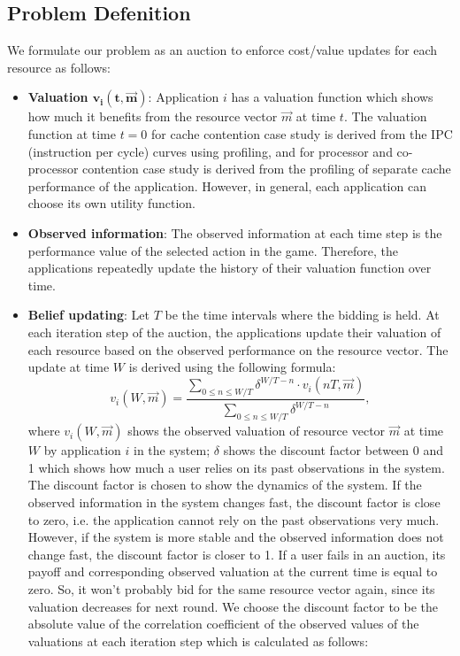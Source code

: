 \subsection{Problem Defenition} 
\indent We formulate our problem as an auction to enforce cost/value updates for each resource as follows: 
\begin{itemize}
  \item \textbf{Valuation $\mathbf{v_{i}(t,\vec{m})}$}: Application $i$ has a valuation function which shows how much it benefits from the resource vector $\vec{m}$ at time $t$. The valuation function at time $t=0$ for cache contention case study is derived from the IPC (instruction per cycle) curves using profiling, and for processor and co-processor contention case study is derived from the profiling of separate cache performance of the application. However, in general, each application can choose its own utility function.
    \item \textbf{Observed information}: The observed information at each time step is the performance value of the selected action in the game. Therefore, the applications repeatedly update the history of their valuation function over time.  
    \item \textbf{Belief updating}: Let $T$ be the time intervals where the bidding is held. At each iteration step of the auction, the applications update their valuation of each resource based on the observed performance on the resource vector. The update at time $W$ is derived using the following formula:
\begin{equation}\label{eq:belief}
v_{i}(W,\vec{m})=\frac{\sum\limits_{0\leq n\leq W/T} {\delta}^{W/T-n} \cdot v_{i}(nT,\vec{m})}{\sum\limits_{0\leq n\leq W/T} {\delta}^{W/T-n}},
\end{equation}
where $v_{i}(W,\vec{m})$ shows the observed valuation of resource vector $\vec{m}$ at time $W$ by application $i$ in the system; $\delta$ shows the discount factor between 0 and 1 which shows how much a user relies on its past observations in the system. The discount factor is chosen to show the dynamics of the system. If the observed information in the system changes fast, the discount factor is close to zero, i.e. the application cannot rely on the past observations very much. However, if the system is more stable and the observed information does not change fast, the discount factor is closer to 1. If a user fails in an auction, its payoff and corresponding observed valuation at the current time is equal to zero. So, it won't probably bid for the same resource vector again, since its valuation decreases for next round. We choose the discount factor to be the absolute value of the correlation coefficient of the observed values of the valuations at each iteration step which is calculated as follows:

\end{itemize}

